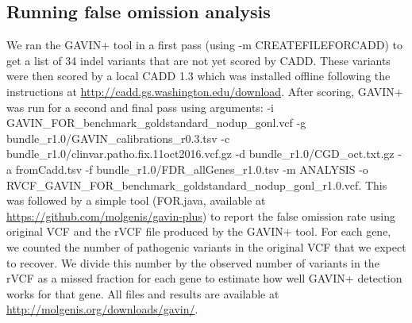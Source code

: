 \subsection{Running false omission analysis}
We ran the GAVIN+ tool in a first pass (using -m CREATEFILEFORCADD) to get a list of 34 indel variants that are not yet scored by CADD.
These variants were then scored by a local CADD 1.3 which was installed offline following the instructions at \url{http://cadd.gs.washington.edu/download}.
After scoring, GAVIN+ was run for a second and final pass using arguments: -i GAVIN\_\-FOR\_\-benchmark\_\-goldstandard\_\-nodup\_\-gonl.vcf -g bundle\_\-r1.0/GAVIN\_\-calibrations\_\-r0.3.tsv -c bundle\_\-r1.0/clinvar.patho.fix.11oct2016.vcf.gz -d bundle\_\-r1.0/CGD\_\-oct\-.txt\-.gz -a fromCadd.tsv -f bundle\_\-r1.0/FDR\_\-allGenes\_\-r1.0.tsv -m ANALYSIS -o RVCF\_\-GAVIN\_\-FOR\_\-benchmark\_\-goldstandard\_\-nodup\_\-gonl\_\-r1.0\-.vcf.
This was followed by a simple tool (FOR.java, available at \url{https://github.com/molgenis/gavin-plus}) to report the false omission rate using original VCF and the rVCF file produced by the GAVIN+ tool.
For each gene, we counted the number of pathogenic variants in the original VCF that we expect to recover.
We divide this number by the observed number of variants in the rVCF as a missed fraction for each gene to estimate how well GAVIN+ detection works for that gene.
All files and results are available at \url{http://molgenis.org/downloads/gavin/}.

